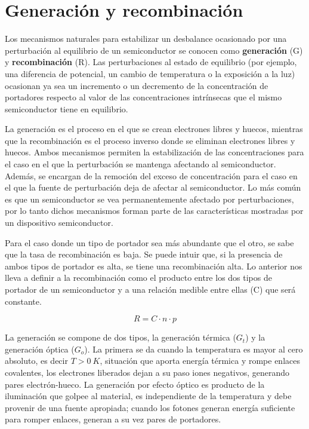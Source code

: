 \section{Generación y recombinación}

Los mecanismos naturales para estabilizar un desbalance ocasionado por una perturbación al equilibrio de un semiconductor se conocen como \textbf{generación} (G) y \textbf{recombinación} (R). Las perturbaciones al estado de equilibrio (por ejemplo, una diferencia de potencial, un cambio de temperatura o la exposición a la luz) ocasionan ya sea un incremento o un decremento de la concentración de portadores respecto al valor de las concentraciones intrínsecas que el mismo semiconductor tiene en equilibrio.

La generación es el proceso en el que se crean electrones libres y huecos, mientras que la recombinación es el proceso inverso donde se eliminan electrones libres y huecos. Ambos mecanismos permiten la estabilización de las concentraciones para el caso en el que la perturbación se mantenga afectando al semiconductor. Además, se encargan de la remoción del exceso de concentración para el caso en el que la fuente de perturbación deja de afectar al semiconductor. Lo más común es que un semiconductor se vea permanentemente afectado por perturbaciones, por lo tanto dichos mecanismos forman parte de las características mostradas por un dispositivo semiconductor.

Para el caso donde un tipo de portador sea más abundante que el otro, se sabe que la tasa de recombinación es baja. Se puede intuir que, si la presencia de ambos tipos de portador es alta, se tiene una recombinación alta. Lo anterior nos lleva a definir a la recombinación como el producto entre los dos tipos de portador de un semiconductor y a una relación medible entre ellas (C) que será constante.   

\[ R = C \cdot n \cdot p \]

La generación se compone de dos tipos, la generación térmica ($G_{t}$) y la generación óptica ($G_{o}$). La primera se da cuando la temperatura es mayor al cero absoluto, es decir $T > 0\ K$, situación que aporta energía térmica y rompe enlaces covalentes, los electrones liberados dejan a su paso iones negativos, generando pares electrón-hueco. La generación por efecto óptico es producto de la iluminación que golpee al material, es independiente de la temperatura y debe provenir de una fuente apropiada; cuando los fotones generan energía suficiente para romper enlaces, generan a su vez pares de portadores.   

